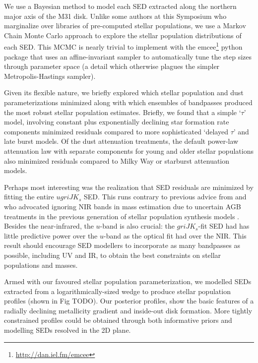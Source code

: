 \documentclass{iau}
\begin{document}
We use a Bayesian method to model each SED extracted along the northern major axis of the M31 disk.
Unlike some authors at this Symposium who marginalize over libraries of pre-computed stellar populations, we use a Markov Chain Monte Carlo approach to explore the stellar population distributions of each SED.
This MCMC is nearly trivial to implement with the emcee\footnote{\url{http://dan.iel.fm/emcee}} python package \citep{Foreman-Mackey:2010} that uses an affine-invariant sampler \cite{Goodman:2009} to automatically tune the step sizes through parameter space (a detail which otherwise plagues the simpler Metropolis-Hastings sampler).

Given its flexible nature, we briefly explored which stellar population and dust parameterizations minimized along with which ensembles of bandpasses produced the most robust stellar population estimates.
Briefly, we found that a simple `$\tau$' model, involving constant plus exponentially declining star formation rate components minimized residuals compared to more sophisticated `delayed $\tau$' and late burst models.
Of the dust attenuation treatments, the default power-law attenuation law with separate components for young and older stellar populations also minimized residuals compared to Milky Way or starburst attenuation models.

Perhaps most interesting was the realization that SED residuals are minimized by fitting the entire $ugriJK_s$ SED.
This runs contrary to previous advice from \cite{Taylor:2011} and \cite{Zibetti:2009} who advocated ignoring NIR bands in mass estimation due to uncertain AGB treatments in the previous generation of stellar population synthesis models \citep[e.g.][]{Bruzual:2003,Maraston:2005}.
Besides the near-infrared, the $u$-band is also crucial: the $griJK_s$-fit SED had has little predictive power over the $u$-band as the optical fit had over the NIR.
This result should encourage SED modellers to incorporate as many bandpasses as possible, including UV and IR, to obtain the best constraints on stellar populations and masses.

Armed with our favoured stellar population parameterization, we modelled SEDs extracted from a logarithmically-sized wedge \citep[e.g.][their Fig TODO]{Courteau:2011} to produce stellar population profiles (shown in Fig TODO).
Our posterior profiles, show the basic features of a radially declining metallicity gradient and inside-out disk formation.
More tightly constrained profiles could be obtained through both informative priors and modelling SEDs resolved in the 2D plane.
\end{document}
